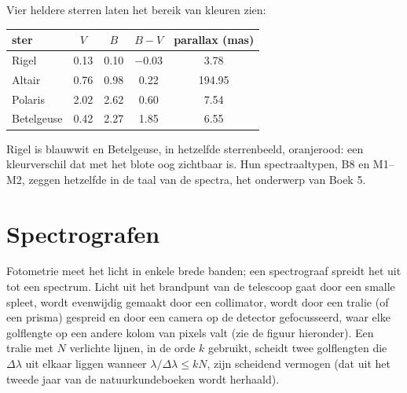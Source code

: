 Vier heldere sterren laten het bereik van kleuren zien:
\begin{center}
\small
\begin{tabular}{lcccc}
\hline
ster & $V$ & $B$ & $B - V$ & parallax (\unit{mas}) \\
\hline
Rigel & 0.13 & 0.10 & $-0.03$ & 3.78 \\
Altair & 0.76 & 0.98 & 0.22 & 194.95 \\
Polaris & 2.02 & 2.62 & 0.60 & 7.54 \\
Betelgeuse & 0.42 & 2.27 & 1.85 & 6.55 \\
\hline
\end{tabular}
\end{center}
Rigel is blauwwit en Betelgeuse, in hetzelfde sterrenbeeld, oranjerood: een kleurverschil dat
met het blote oog zichtbaar is. Hun spectraaltypen, B8 en M1--M2, zeggen hetzelfde in de taal
van de spectra, het onderwerp van Boek 5.

\section{Spectrografen}

Fotometrie meet het licht in enkele brede banden; een spectrograaf spreidt het uit tot een
spectrum. Licht uit het brandpunt van de telescoop gaat door een smalle spleet, wordt
evenwijdig gemaakt door een collimator, wordt door een tralie (of een prisma) gespreid en
door een camera op de detector gefocusseerd, waar elke golflengte op een andere kolom van
pixels valt (zie de figuur hieronder). Een tralie met $N$ verlichte lijnen, in de orde $k$
gebruikt, scheidt twee golflengten die $\Delta\lambda$ uit elkaar liggen wanneer
$\lambda/\Delta\lambda \le kN$, zijn scheidend vermogen (dat uit het tweede jaar van de
natuurkundeboeken wordt herhaald).

